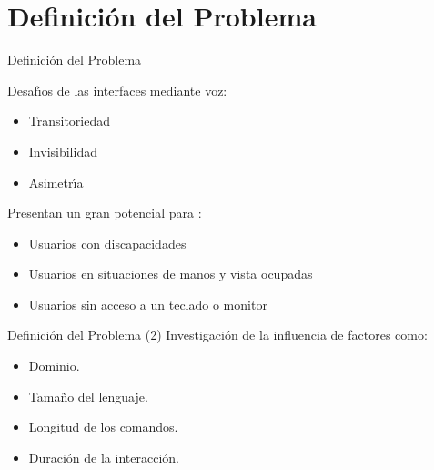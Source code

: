 \section{Definici\'on del Problema}

\begin{frame}{Definici\'on del Problema}

Desaf{\'\i}os de las interfaces mediante voz\cite{GabrielVoice2007}:

\begin{itemize}
    \item Transitoriedad
    \item Invisibilidad
    \item Asimetr{\'\i}a
\end{itemize}

Presentan un gran potencial para \cite{NielsenVoice2003}:

\begin{itemize}
    \item Usuarios con discapacidades
    \item Usuarios en situaciones de manos y vista ocupadas
    \item Usuarios sin acceso a un teclado o monitor
\end{itemize}

\end{frame}

\begin{frame}{Definici\'on del Problema (2)}
Investigaci\'on de la influencia de factores como:

\begin{itemize}
    \item Dominio.
    \item Tama\~no del lenguaje.
    \item Longitud de los comandos.
    \item Duraci\'on de la interacci\'on.
\end{itemize}

\end{frame}
